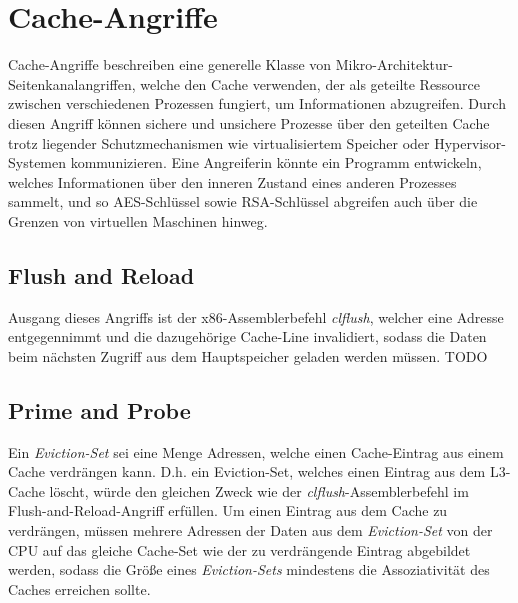 \section{Cache-Angriffe}

Cache-Angriffe beschreiben eine generelle Klasse von Mikro-Architektur-Seitenkanalangriffen, welche den Cache verwenden, der als geteilte Ressource zwischen verschiedenen Prozessen fungiert, um Informationen abzugreifen.  Durch diesen Angriff können sichere und unsichere Prozesse über den geteilten Cache trotz liegender Schutzmechanismen wie virtualisiertem Speicher oder Hypervisor-Systemen kommunizieren. 
Eine Angreiferin könnte ein Programm entwickeln, welches Informationen über den inneren Zustand eines anderen Prozesses sammelt, und so AES-Schlüssel \cite{BernsteinAES} sowie RSA-Schlüssel \cite{CacheAttackRSA} abgreifen auch über die Grenzen von virtuellen Maschinen hinweg.

\subsection{Flush and Reload}

Ausgang dieses Angriffs ist der x86-Assemblerbefehl \textit{clflush}, welcher eine Adresse entgegennimmt und die dazugehörige Cache-Line invalidiert, sodass die Daten beim nächsten Zugriff aus dem Hauptspeicher geladen werden müssen. TODO 

\subsection{Prime and Probe}

Ein \textit{Eviction-Set} sei eine Menge Adressen, welche einen Cache-Eintrag aus einem Cache verdrängen kann. D.h. ein Eviction-Set, welches einen Eintrag aus dem L3-Cache löscht, würde den gleichen Zweck wie der \textit {clflush}-Assemblerbefehl im Flush-and-Reload-Angriff erfüllen. 
Um einen Eintrag aus dem Cache zu verdrängen, müssen mehrere Adressen der Daten aus dem \textit{Eviction-Set}  von der CPU auf das gleiche Cache-Set wie der zu verdrängende Eintrag abgebildet werden, sodass die Größe eines \textit{Eviction-Sets} mindestens die Assoziativität des Caches erreichen sollte.

